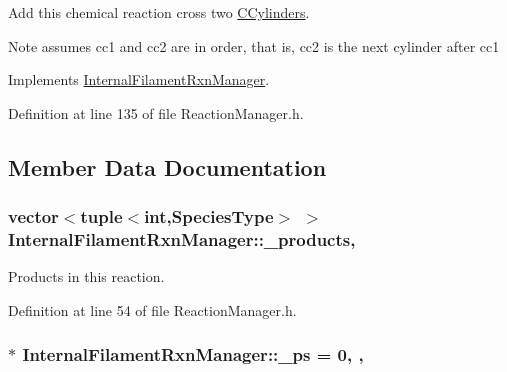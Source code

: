 Add this chemical reaction cross two \hyperlink{classCCylinder}{C\+Cylinders}. 

\begin{DoxyNote}{Note}
assumes cc1 and cc2 are in order, that is, cc2 is the next cylinder after cc1 
\end{DoxyNote}


Implements \hyperlink{classInternalFilamentRxnManager_ac8152bcd9f6aa5d69f85a98cff86d2b0}{Internal\+Filament\+Rxn\+Manager}.



Definition at line 135 of file Reaction\+Manager.\+h.



\subsection{Member Data Documentation}
\hypertarget{classInternalFilamentRxnManager_afd213da1a3706e2e88962e5da886a5dc}{
\subsubsection[{\+\_\+products}]{\setlength{\rightskip}{0pt plus 5cm}vector$<$tuple$<$int,{\bf Species\+Type}$>$ $>$ Internal\+Filament\+Rxn\+Manager\+::\+\_\+products\hspace{0.3cm}{\ttfamily [protected]}, {\ttfamily [inherited]}}}\label{classInternalFilamentRxnManager_afd213da1a3706e2e88962e5da886a5dc}


Products in this reaction. 



Definition at line 54 of file Reaction\+Manager.\+h.

\hypertarget{classInternalFilamentRxnManager_a973ce9cc2aae811e6867afa46193c5f2}{
\subsubsection[{\+\_\+ps}]{ $\ast$ Internal\+Filament\+Rxn\+Manager\+::\+\_\+ps = 0\hspace{0.3cm}{\ttfamily [static]}, {\ttfamily [protected]}, {\ttfamily [inherited]}}}\label{classInternalFilamentRxnManager_a973ce9cc2aae811e6867afa46193c5f2}


